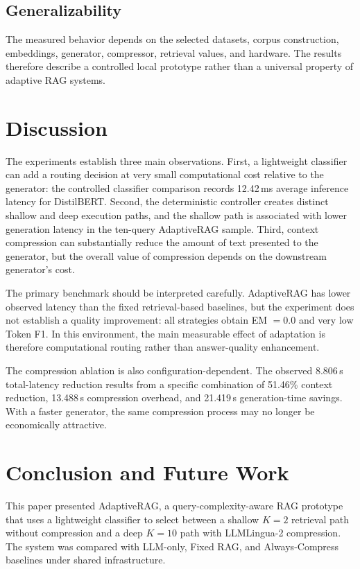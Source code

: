 \documentclass[conference]{IEEEtran}
\begin{document}
\subsection{Generalizability}
The measured behavior depends on the selected datasets, corpus construction, embeddings, generator, compressor, retrieval values, and hardware. The results therefore describe a controlled local prototype rather than a universal property of adaptive RAG systems.

\section{Discussion}

The experiments establish three main observations. First, a lightweight classifier can add a routing decision at very small computational cost relative to the generator: the controlled classifier comparison records 12.42\,ms average inference latency for DistilBERT. Second, the deterministic controller creates distinct shallow and deep execution paths, and the shallow path is associated with lower generation latency in the ten-query AdaptiveRAG sample. Third, context compression can substantially reduce the amount of text presented to the generator, but the overall value of compression depends on the downstream generator's cost.

The primary benchmark should be interpreted carefully. AdaptiveRAG has lower observed latency than the fixed retrieval-based baselines, but the experiment does not establish a quality improvement: all strategies obtain EM $=0.0$ and very low Token F1. In this environment, the main measurable effect of adaptation is therefore computational routing rather than answer-quality enhancement.

The compression ablation is also configuration-dependent. The observed 8.806\,s total-latency reduction results from a specific combination of 51.46\% context reduction, 13.488\,s compression overhead, and 21.419\,s generation-time savings. With a faster generator, the same compression process may no longer be economically attractive.

\section{Conclusion and Future Work}

This paper presented AdaptiveRAG, a query-complexity-aware RAG prototype that uses a lightweight classifier to select between a shallow $K=2$ retrieval path without compression and a deep $K=10$ path with LLMLingua-2 compression. The system was compared with LLM-only, Fixed RAG, and Always-Compress baselines under shared infrastructure.
\end{document}
